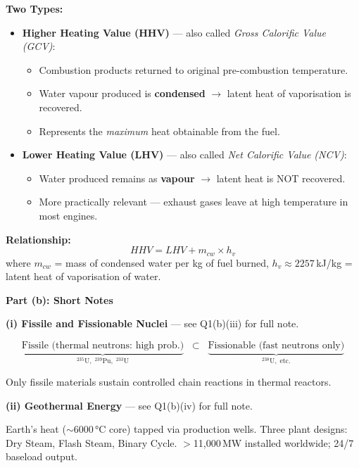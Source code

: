 \documentclass[12pt,a3paper]{article}
\begin{document}
\begin{enumerate}
\begin{tcolorbox}[enhanced,breakable,ansbox,colback=cA!4,colframe=cA,
  boxrule=0.8pt,arc=5pt,
  title={\textbf{Answer}},fonttitle=\bfseries\color{white},colbacktitle=cA]
\textbf{Two Types:}

\begin{itemize}[leftmargin=1.5em,itemsep=4pt]
  \item \textbf{Higher Heating Value (HHV)} — also called \emph{Gross Calorific Value (GCV)}:
    \begin{itemize}[leftmargin=1.5em,itemsep=1pt]
      \item Combustion products returned to original pre-combustion temperature.
      \item Water vapour produced is \textbf{condensed} $\to$ latent heat of vaporisation is recovered.
      \item Represents the \emph{maximum} heat obtainable from the fuel.
    \end{itemize}

  \item \textbf{Lower Heating Value (LHV)} — also called \emph{Net Calorific Value (NCV)}:
    \begin{itemize}[leftmargin=1.5em,itemsep=1pt]
      \item Water produced remains as \textbf{vapour} $\to$ latent heat is NOT recovered.
      \item More practically relevant — exhaust gases leave at high temperature in most engines.
    \end{itemize}
\end{itemize}

\textbf{Relationship:}
\[
  \boxed{HHV = LHV + m_{cw} \times h_v}
\]
where $m_{cw}$ = mass of condensed water per kg of fuel burned, $h_v \approx 2257$\,kJ/kg = latent heat of vaporisation of water.

\hrulefill

\textbf{Part (b): Short Notes}

\medskip
\textbf{(i) Fissile and Fissionable Nuclei} — see Q1(b)(iii) for full note.

\[
  \underbrace{\text{Fissile (thermal neutrons: high prob.)}}_{\displaystyle {}^{235}\text{U},\;{}^{239}\text{Pu},\;{}^{233}\text{U}}
  \;\;\subset\;\;
  \underbrace{\text{Fissionable (fast neutrons only)}}_{\displaystyle {}^{238}\text{U},\;\text{etc.}}
\]

Only fissile materials sustain controlled chain reactions in thermal reactors.

\medskip
\textbf{(ii) Geothermal Energy} — see Q1(b)(iv) for full note.

Earth's heat ($\sim$6000\,°C core) tapped via production wells. Three plant designs: Dry Steam, Flash Steam, Binary Cycle. $>$11,000\,MW installed worldwide; 24/7 baseload output.


\end{tcolorbox}
\end{enumerate}
\end{document}
